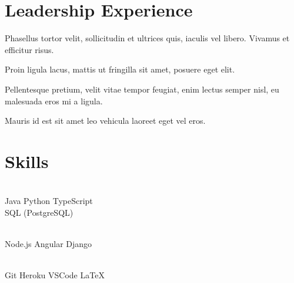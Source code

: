 \documentclass[]{resume}
\begin{document}

\section{Leadership Experience} 

\hspace*{\fill}
\begin{tightemize}
    \item Phasellus tortor velit, sollicitudin et ultrices quis, iaculis vel libero. Vivamus et efficitur risus. 
    \item Proin ligula lacus, mattis ut fringilla sit amet, posuere eget elit.
\end{tightemize}
\sectionsep

\hspace*{\fill}
\begin{tightemize}
    \item Pellentesque pretium, velit vitae tempor feugiat, enim lectus semper nisl, eu malesuada eros mi a ligula.
    \item Mauris id est sit amet leo vehicula laoreet eget vel eros.
\end{tightemize}
\sectionsep


\section{Skills}

\begin{minipage}[t]{0.3\textwidth} 
    \sectionsep \\
    Java \textbullet{} Python \textbullet{} TypeScript \textbullet{} \\
    SQL (PostgreSQL)
\end{minipage}
\hfill\vline\hfill
\begin{minipage}[t]{0.3\textwidth} 
    \sectionsep \\
    Node.js \textbullet{} Angular \textbullet{} Django
\end{minipage}
\hfill\vline\hfill
\begin{minipage}[t]{0.3\textwidth} 
    \sectionsep \\
    Git \textbullet{} Heroku \textbullet{} VSCode \textbullet{} \LaTeX
\end{minipage}
\end{document}
